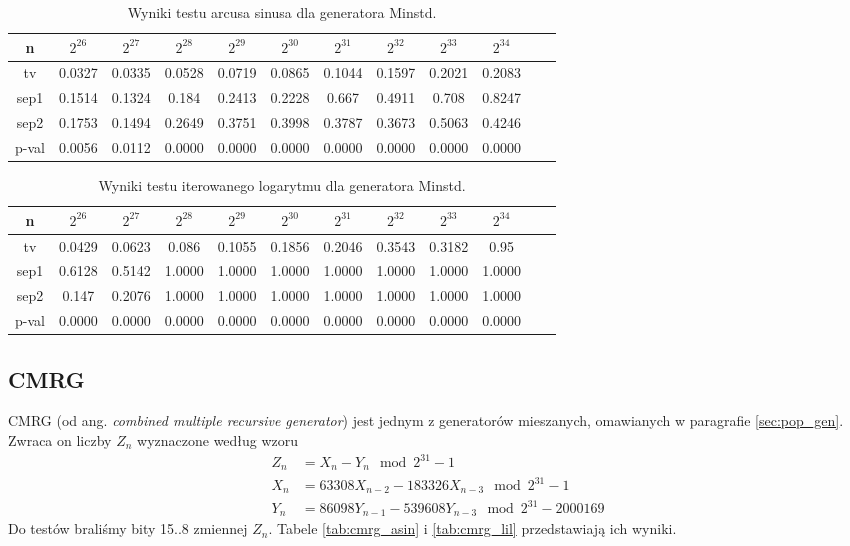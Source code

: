 \documentclass[a4paper,11pt,twoside]{book}
\theoremstyle{definition}
\begin{document}
\begin{table}[ht!]
\centering
 \caption{Wyniki testu arcusa sinusa dla generatora Minstd.}
 \label{tab:minstd_asin}
\begin{tabular} {||c|c|c|c|c|c|c|c|c|c|c|c||}  
 \hline
     n &  $2^{26}$ &  $2^{27}$ &  $2^{28}$ &  $2^{29}$ &  $2^{30}$ &  $2^{31}$ &  $2^{32}$ &  $2^{33}$ &  $2^{34}$\\ \hline
     tv &  0.0327 &  0.0335 &  0.0528 &  0.0719 &  0.0865 &  0.1044 &  0.1597 &  0.2021 &  0.2083\\ \hline
   sep1 &  0.1514 &  0.1324 &   0.184 &  0.2413 &  0.2228 &   0.667 &  0.4911 &   0.708 &  0.8247\\ \hline
   sep2 &  0.1753 &  0.1494 &  0.2649 &  0.3751 &  0.3998 &  0.3787 &  0.3673 &  0.5063 &  0.4246\\ \hline
  p-val &  0.0056 &  0.0112 &  0.0000 &  0.0000 &  0.0000 &  0.0000 &  0.0000 &  0.0000 &  0.0000\\ \hline
\end{tabular}  
\end{table}
\begin{table}[ht!]
\centering
 \caption{Wyniki testu iterowanego logarytmu dla generatora Minstd.}
 \label{tab:minstd_lil}
\begin{tabular} {||c|c|c|c|c|c|c|c|c|c|c|c||}  
 \hline 
     n &  $2^{26}$ &  $2^{27}$ &  $2^{28}$ &  $2^{29}$ &  $2^{30}$ &  $2^{31}$ &  $2^{32}$ &  $2^{33}$ &  $2^{34}$\\ \hline
     tv &  0.0429 &  0.0623 &   0.086 &  0.1055 &  0.1856 &  0.2046 &  0.3543 &  0.3182 &    0.95\\ \hline
   sep1 &  0.6128 &  0.5142 &  1.0000 &  1.0000 &  1.0000 &  1.0000 &  1.0000 &  1.0000 &  1.0000\\ \hline
   sep2 &   0.147 &  0.2076 &  1.0000 &  1.0000 &  1.0000 &  1.0000 &  1.0000 &  1.0000 &  1.0000\\ \hline
  p-val &  0.0000 &  0.0000 &  0.0000 &  0.0000 &  0.0000 &  0.0000 &  0.0000 &  0.0000 &  0.0000\\ \hline
\end{tabular}  
\end{table}



\FloatBarrier
\subsection{CMRG}
CMRG (od ang. \textit{combined multiple recursive generator}) jest jednym z generatorów mieszanych, omawianych w paragrafie \ref{sec:pop_gen}. Zwraca on liczby $Z_n$ wyznaczone według wzoru
\begin{equation}
 \begin{split}
    Z_n &= X_n - Y_n \mod 2^{31}-1 \\
    X_n &= 63308 X_{n-2} - 183326 X_{n-3} \mod 2^{31}-1 \\
    Y_n &= 86098 Y_{n-1} - 539608 Y_{n-3} \mod 2^{31} - 2000169
 \end{split}
\end{equation}
Do testów braliśmy bity 15..8 zmiennej $Z_n$. Tabele \ref{tab:cmrg_asin} i \ref{tab:cmrg_lil} przedstawiają ich wyniki.
\end{document}
